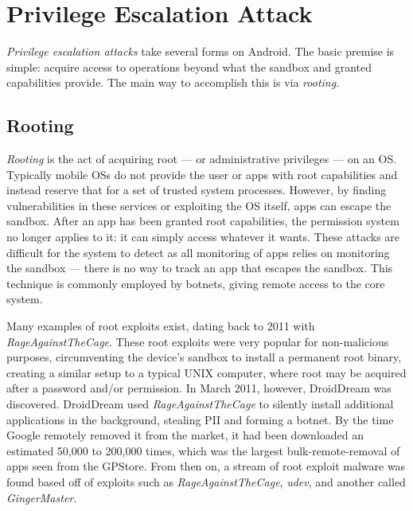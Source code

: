 \section{Privilege Escalation Attack}
\textit{Privilege escalation attacks} take several forms on Android. The basic premise is simple: acquire access to operations beyond what the sandbox and granted capabilities provide. The main way to accomplish this is via \textit{rooting}.

\subsection{Rooting}
\textit{Rooting} is the act of acquiring root --- or administrative privileges --- on an OS. Typically mobile OSs do not provide the user or apps with root capabilities and instead reserve that for a set of trusted system processes. However, by finding vulnerabilities in these services or exploiting the OS itself, apps can escape the sandbox. After an app has been granted root capabilities, the permission system no longer applies to it: it can simply access whatever it wants. These attacks are difficult for the system to detect as all monitoring of apps relies on monitoring the sandbox --- there is no way to track an app that escapes the sandbox. This technique is commonly employed by botnets, giving remote access to the core system. 

Many examples of root exploits exist, dating back to 2011 with \textit{RageAgainstTheCage}\citep{droiddream}. These root exploits were very popular for non-malicious purposes, circumventing the device's sandbox to install a permanent root binary, creating a similar setup to a typical UNIX computer, where root may be acquired after a password and/or permission. In March 2011, however, DroidDream was discovered. DroidDream used \textit{RageAgainstTheCage} to silently install additional applications in the background, stealing PII and forming a botnet. By the time Google remotely removed it from the market, it had been downloaded an estimated 50,000 to 200,000 times\citep{castillo2010android}, which was the largest bulk-remote-removal of apps seen from the GPStore. From then on, a stream of root exploit malware was found based off of exploits such as \textit{RageAgainstTheCage}, \textit{udev}, and another called \textit{GingerMaster}\citep{gingermaster}.


